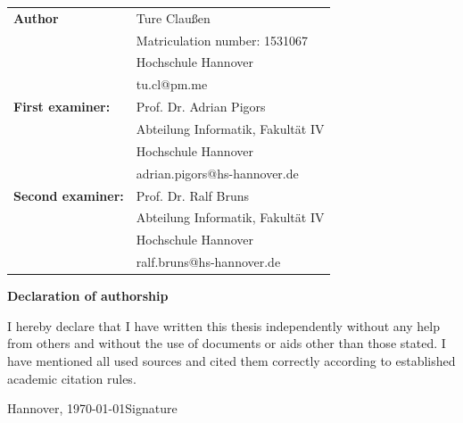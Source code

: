 \documentclass[fontsize=12pt,paper=a4,twoside,parskip=half-,headsepline,headinclude, abstract=on]{scrreprt}
\begin{document}
\newpage \thispagestyle{empty}
\begin{tabular}{ll}
    {\bfseries\sffamily Author}           & Ture Claußen                      \\
                                          & Matriculation number: 1531067     \\
                                          & Hochschule Hannover               \\
                                          & tu.cl@pm.me                       \\[5ex]
    {\bfseries\sffamily First examiner:}  & Prof. Dr. Adrian Pigors           \\
                                          & Abteilung Informatik, Fakultät IV \\
                                          & Hochschule Hannover               \\
                                          & adrian.pigors@hs-hannover.de      \\[5ex]
    {\bfseries\sffamily Second examiner:} & Prof. Dr. Ralf Bruns              \\
                                          & Abteilung Informatik, Fakultät IV \\
                                          & Hochschule Hannover               \\
                                          & ralf.bruns@hs-hannover.de
\end{tabular}

\vfill

\begin{center} \sffamily\bfseries Declaration of authorship \end{center}

I hereby declare that I have written this thesis independently without any help from others and without the use of documents or aids other than those stated. I have mentioned all used sources and cited them correctly according to established academic citation rules.
\vspace*{7ex}

Hannover, \today \hfill Signature
\tableofcontents












\end{document}
